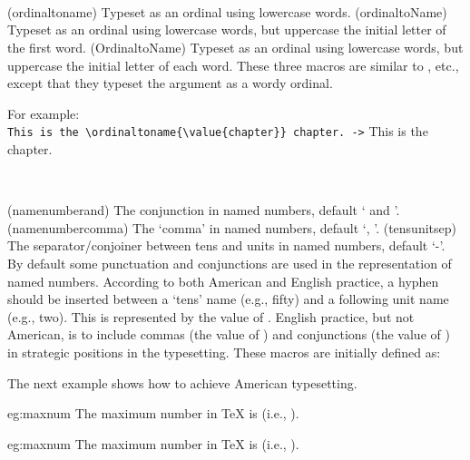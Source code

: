 \begin{syntax}
\cmd{\ordinaltoname} \\
\cmd{\ordinaltoName} \\
\cmd{\OrdinalToName} \\
\end{syntax}
\glossary(ordinaltoname)%
  {}%
  {Typeset  as an ordinal using lowercase words.}
\glossary(ordinaltoName)%
  {}%
  {Typeset  as an ordinal using lowercase words, but uppercase the
   initial letter of the first word.}
\glossary(OrdinaltoName)%
  {}%
  {Typeset  as an ordinal using lowercase words, but uppercase the
   initial letter of each word.}
These three macros are similar to \cmd{\numtoname}, etc., except that they
typeset the argument as a wordy ordinal.

    For example: \\
\verb?This is the \ordinaltoname{\value{chapter}} chapter. ->? 
  This is the \ordinaltoname{\value{chapter}} chapter.

\begin{syntax}
\cmd{\namenumberand} \cmd{\namenumbercomma} \cmd{\tensunitsep} \\
\end{syntax}
\glossary(namenumberand)%
  {}%
  {The conjunction in named numbers, default ` and '.}
\glossary(namenumbercomma)%
  {}%
  {The `comma' in named numbers, default `, '.}
\glossary(tensunitsep)%
  {}%
  {The separator/conjoiner between tens and units in named numbers, default `-'.}
By default some punctuation and conjunctions are used in the representation
of named numbers. According to both American and English practice, a hyphen
should be inserted between a `tens' name (e.g., fifty) and a following 
unit name (e.g., two). This is represented by the value of \cmd{\tensunitsep}.
English practice, but not American, is to include commas (the value of
\cmd{\namenumbercomma}) and conjunctions (the value of \cmd{\namenumberand})
in strategic positions in the typesetting. These macros are initially
defined as:
\begin{lcode}
\newcommand*{\namenumberand}{ and }
\newcommand*{\namenumbercomma}{, }
\newcommand*{\tensunitsep}{-}
\end{lcode}
The next example shows how to achieve American typesetting.
\begin{egsource}{eg:maxnum}
\renewcommand*{\namenumberand}{ }
\renewcommand*{\namenumbercomma}{ }
The maximum number in TeX is  
(i.e., ).
\end{egsource}
\begin{egresult}{eg:maxnum}
\renewcommand*{\namenumberand}{ }\renewcommand*{\namenumbercomma}{ }%
The maximum number in TeX is  
(i.e., ). 
\end{egresult}
\renewcommand*{\namenumberand}{ and }
\renewcommand*{\namenumbercomma}{, }

